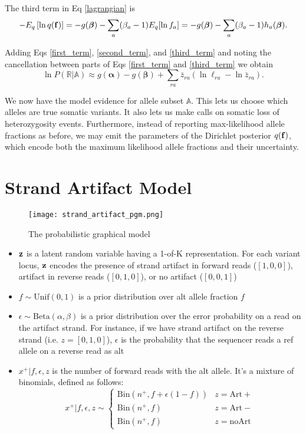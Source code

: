 \documentclass[nofootinbib,amssymb,amsmath]{revtex4}
\newcommand{\vf}{{\bf f}}
\newcommand{\vz}{{\bf z}}
\newcommand{\valpha}{{\bm{\alpha}}}
\newcommand{\vbeta}{{\bm{\beta}}}
\begin{document}
The third term in Eq \ref{lagrangian} is
\begin{align}
- E_q \left[ \ln q(\vf) \right] = -g(\vbeta) - \sum_a (\beta_a - 1) E_q [\ln f_a] = -g(\vbeta) - \sum_a (\beta_a - 1) h_a(\vbeta) \label{third_term}.
\end{align}

Adding Eqs \ref{first_term}, \ref{second_term}, and \ref{third_term} and noting the cancellation between parts of Eqs \ref{first_term} and \ref{third_term} we obtain
\begin{equation}
\ln P(\mathbb{R} | \mathbb{A}) \approx g(\valpha) - g(\vbeta) +  \sum_{ra} \bar{z}_{ra} \left( \ln \ell_{ra} - \ln \bar{z}_{ra} \right).
\end{equation}

We now have the model evidence for allele subset $\mathbb{A}$.  This lets us choose which alleles are true somatic variants.  It also lets us make calls on somatic loss of heterozygosity events.  Furthermore, instead of reporting max-likelihood allele fractions as before, we may emit the parameters of the Dirichlet posterior $q(\vf)$, which encode both the maximum likelihood allele fractions and their uncertainty.

\section{Strand Artifact Model}
\begin{figure}
\centering
\texttt{[image: strand\_artifact\_pgm.png]}
\caption{\label{fig:frog}The probabilistic graphical model}
\end{figure}

\begin{itemize}
	\item $\vz$ is a latent random variable having a 1-of-K representation. For each variant locus, $\vz$ encodes the presence of strand artifact in forward reads ($[1, 0, 0]$), artifact in reverse reads ($[0, 1, 0]$), or no artifact ($[0, 0, 1]$)
	\item $f \sim \text{Unif}(0, 1)$ is a prior distribution over alt allele fraction $f$
	\item $\epsilon \sim \text{Beta}(\alpha, \beta)$ is a prior distribution over the error probability on a read on the artifact strand. For instance, if we have strand artifact on the reverse strand (i.e. $z = [0, 1, 0]$), $\epsilon$ is the probability that the sequencer reads a ref allele on a reverse read as alt
	\item $x^+ | f, \epsilon, z$ is the number of forward reads with the alt allele. It's a mixture of binomials, defined as follows:
	\begin{equation}
	x^+ | f, \epsilon, z \sim
		\begin{cases}
			\text{Bin} (n^+, f + \epsilon(1-f)) & z = \mathrm{Art+}\\
			 \text{Bin} (n^+, f) 			& z = \mathrm{Art-} \\
			 \text{Bin} (n^+, f)			& z = \mathrm{noArt}
		\end{cases}
	\end{equation}
\end{itemize}
\end{document}
